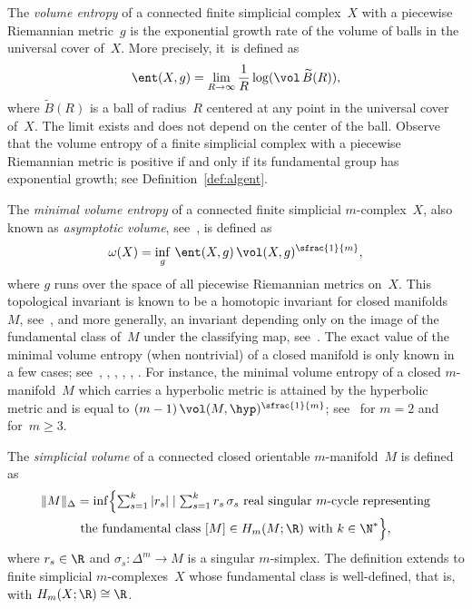 \begin{definition}
The \emph{volume entropy} of a connected finite simplicial complex~$X$ with a piecewise Riemannian metric~$g$ is the exponential growth rate of the volume of balls in the universal cover of~$X$.
More precisely, it~is defined as
\begin{equation}\label{eq:entropy.comp.space}
\ent(X, g) =\lim_{R \to \infty} \frac{1}{R} \log(\vol \, \widetilde{B}(R)),
\end{equation}
where $\widetilde{B}(R)$ is a ball of radius~$R$ centered at any point in the universal cover of~$X$.
The limit exists and does not depend on the center of the ball.
Observe that the volume entropy of a finite simplicial complex with a piecewise Riemannian metric is positive if and only if its fundamental group has exponential growth; see Definition~\ref{def:algent}.

The \emph{minimal volume entropy} of a connected finite simplicial $m$\nobreakdash-complex~$X$, also known as \emph{asymptotic volume}, see~\cite{B93}, is defined as
\[
\omega(X) = \inf_g \, \ent(X,g) \, \vol(X,g)^\sfrac{1}{m},
\]
where $g$ runs over the space of all piecewise Riemannian metrics on~$X$.
This topological invariant is known to be a homotopic invariant for closed manifolds~$M$, see~\cite{B93}, and more generally, an invariant depending only on the image of the fundamental class of~$M$ under the classifying map, see~\cite{Brunnbauer08}.
The exact value of the minimal volume entropy (when nontrivial) of a closed manifold is only known in a few cases; see~\cite{katok}, \cite{BCG91}, \cite{Sambusetti99}, \cite{Sambusetti00}, \cite{CB03}, \cite{merlin}.
For instance, the minimal volume entropy of a closed $m$\nobreakdash-manifold~$M$ which carries a hyperbolic metric is attained by the hyperbolic metric and is equal to $(m-1) \, \vol(M,\hyp)^\sfrac{1}{m}$; see~\cite{katok} for $m=2$ and~\cite{BCG91} for~$m \geq 3$.

The \emph{simplicial volume} of a connected closed orientable $m$\nobreakdash-manifold~$M$ is defined as
\begin{multline*}\textstyle
\Vert M \Vert_\Delta = \inf \Bigl\{\sum_{s=1}^k |r_s| \mid \sum_{s=1}^k r_s \, \sigma_s \text{ real singular } m\text{-cycle representing} \\
\text{the fundamental class } [M] \in H_m(M;\R) \mbox{ with } k \in \N^* \Bigr\},
\end{multline*}
where $r_s \in \R$ and $\sigma_s:\Delta^m \to M$ is a singular $m$\nobreakdash-simplex.
The definition extends to finite simplicial $m$\nobreakdash-complexes~$X$ whose fundamental class is well-defined, that is, with $H_m(X;\R) \cong \R$.
\end{definition}

